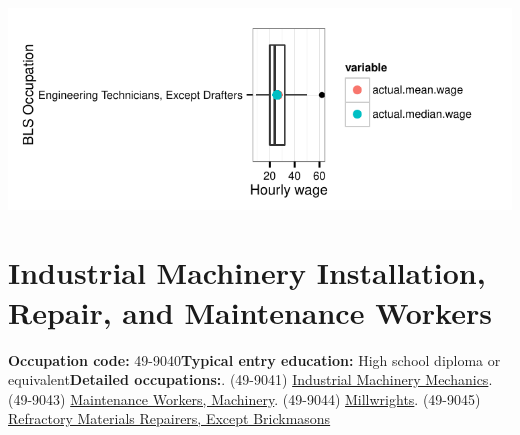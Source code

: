 \documentclass[a4paper,10pt]{article}\usepackage[]{graphicx}\usepackage[]{color}
\makeatletter
\def\maxwidth{ %
  \ifdim\Gin@nat@width>\linewidth
    \linewidth
  \else
    \Gin@nat@width
  \fi
}
\makeatother
\begin{document}
{\centering \includegraphics[width=\maxwidth]{figure/unnamed-chunk-277} 

}


\newpage\section{Industrial Machinery Installation, Repair, and Maintenance Workers}\textbf{Occupation code:} 49-9040\newline\textbf{Typical entry education:} High school diploma or equivalent\newline\textbf{Detailed occupations:}. (49-9041)  \href{http://www.bls.gov/oes/current/oes499041.htm}{Industrial Machinery Mechanics}. (49-9043)  \href{http://www.bls.gov/oes/current/oes499043.htm}{Maintenance Workers, Machinery}. (49-9044)  \href{http://www.bls.gov/oes/current/oes499044.htm}{Millwrights}. (49-9045)  \href{http://www.bls.gov/oes/current/oes499045.htm}{Refractory Materials Repairers, Except Brickmasons}\newline%
\end{document}
